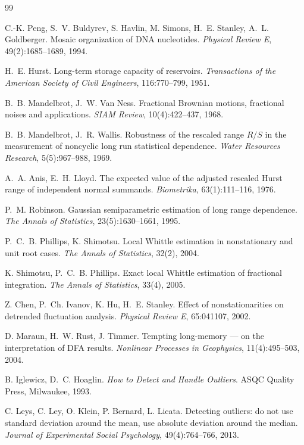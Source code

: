 \documentclass[11pt,a4paper]{article}
\theoremstyle{definition}
\begin{document}
\begin{thebibliography}{99}

 C.-K. Peng, S.~V. Buldyrev, S. Havlin, M. Simons, H.~E. Stanley,
A.~L. Goldberger. Mosaic organization of DNA nucleotides. \textit{Physical Review E},
49(2):1685--1689, 1994.

 H.~E. Hurst. Long-term storage capacity of reservoirs.
\textit{Transactions of the American Society of Civil Engineers}, 116:770--799, 1951.

 B.~B. Mandelbrot, J.~W. Van Ness. Fractional Brownian
motions, fractional noises and applications. \textit{SIAM Review}, 10(4):422--437,
1968.

 B.~B. Mandelbrot, J.~R. Wallis. Robustness of the rescaled
range $R/S$ in the measurement of noncyclic long run statistical dependence.
\textit{Water Resources Research}, 5(5):967--988, 1969.

 A.~A. Anis, E.~H. Lloyd. The expected value of the adjusted
rescaled Hurst range of independent normal summands. \textit{Biometrika},
63(1):111--116, 1976.

 P.~M. Robinson. Gaussian semiparametric estimation of long
range dependence. \textit{The Annals of Statistics}, 23(5):1630--1661, 1995.

 P.~C.~B. Phillips, K. Shimotsu. Local Whittle estimation in
nonstationary and unit root cases. \textit{The Annals of Statistics}, 32(2), 2004.

 K. Shimotsu, P.~C.~B. Phillips. Exact local Whittle
estimation of fractional integration. \textit{The Annals of Statistics}, 33(4), 2005.

 Z. Chen, P.~Ch. Ivanov, K. Hu, H.~E. Stanley. Effect of
nonstationarities on detrended fluctuation analysis. \textit{Physical Review E},
65:041107, 2002.

 D. Maraun, H.~W. Rust, J. Timmer. Tempting long-memory --- on
the interpretation of DFA results. \textit{Nonlinear Processes in Geophysics},
11(4):495--503, 2004.

 B. Iglewicz, D.~C. Hoaglin. \textit{How to Detect and Handle
Outliers}. ASQC Quality Press, Milwaukee, 1993.

 C. Leys, C. Ley, O. Klein, P. Bernard, L. Licata. Detecting
outliers: do not use standard deviation around the mean, use absolute deviation
around the median. \textit{Journal of Experimental Social Psychology},
49(4):764--766, 2013.


\end{thebibliography}
\end{document}
